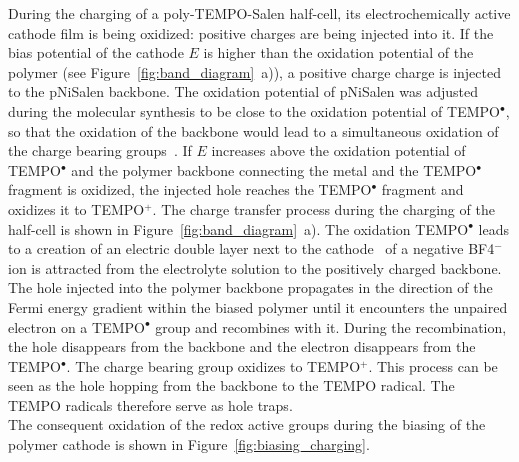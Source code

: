 \par
During the charging of a poly-TEMPO-Salen half-cell, its electrochemically active cathode film is being oxidized: positive charges are being injected into it. If the bias potential of the cathode $E$ is higher than the oxidation potential of the polymer (see Figure~\ref{fig:band_diagram}~a)), a positive charge charge is injected to the pNiSalen backbone. The oxidation potential of pNiSalen was adjusted during the molecular synthesis to be close to the oxidation potential of TEMPO$^{\bullet}$, so that the oxidation of the backbone would lead to a simultaneous oxidation of the charge bearing groups~\cite{Vereshchagin2020}. If $E$ increases above the oxidation potential of TEMPO$^{\bullet}$ and the polymer backbone connecting the metal and the TEMPO$^{\bullet}$ fragment is oxidized, the injected hole reaches the TEMPO$^{\bullet}$ fragment and oxidizes it to TEMPO$^+$. The charge transfer process during the charging of the half-cell is shown in Figure~\ref{fig:band_diagram}~a). The oxidation TEMPO$^{\bullet}$ leads to a creation of an electric double layer next to the cathode~\cite{Bhojane2022} of a negative BF4${^-}$ ion is attracted from the electrolyte solution to the positively charged backbone.\\

The hole injected into the polymer backbone propagates in the direction of the Fermi energy gradient within the biased polymer until it encounters the unpaired electron on a TEMPO$^{\bullet}$ group and recombines with it. During the recombination, the hole disappears from the backbone and the electron disappears from the TEMPO$^{\bullet}$. The charge bearing group oxidizes to TEMPO$^+$. This process can be seen as the hole hopping from the backbone to the TEMPO radical. The TEMPO radicals therefore serve as hole traps.\\

The consequent oxidation of the redox active groups during the biasing of the polymer cathode is shown in Figure~\ref{fig:biasing_charging}.


